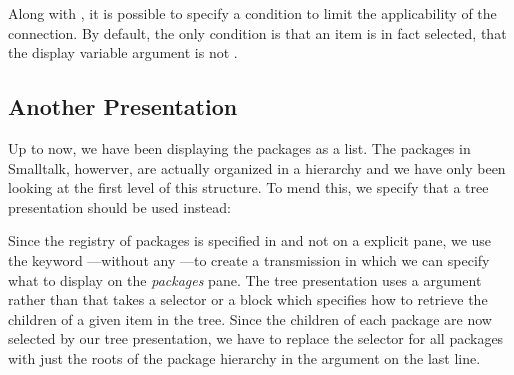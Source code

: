 \documentclass[a4paper,10pt,twoside]{book}
\begin{document}
Along with , it is possible to specify a 
condition to limit the applicability of the connection. By default,
the only condition is that an item is in fact selected, \ie{} that the
display variable argument is not .

\subsection{Another Presentation}

Up to now, we have been displaying the packages as a list. The
packages in Smalltalk, howerver, are actually organized in a hierarchy
and we have only been looking at the first level of this structure. To
mend this, we specify that a tree presentation should be used instead:



Since the registry of packages is specified in  and not on
a explicit pane, we use the keyword ---without any
---to create a transmission in which we can specify what to
display on the \emph{packages} pane. The tree presentation uses a
 argument rather than  that takes a
selector or a block which specifies how to retrieve the children of a
given item in the tree. Since the children of each package are now
selected by our tree presentation, we have to replace the selector for
all packages with just the roots of the package hierarchy in the
 argument on the last line.
\end{document}
